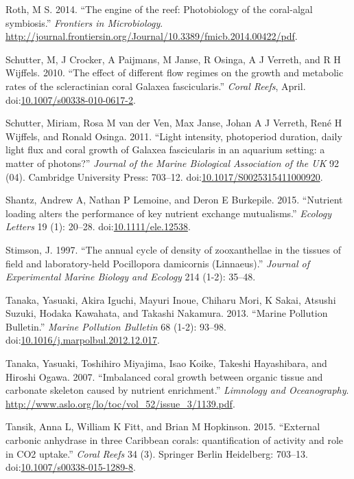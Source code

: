 \documentclass[]{elsarticle} %
\begin{document}
\hypertarget{ref-Roth:2014wf}{}
Roth, M S. 2014. ``The engine of the reef: Photobiology of the
coral-algal symbiosis.'' \emph{Frontiers in Microbiology}.
\url{http://journal.frontiersin.org/Journal/10.3389/fmicb.2014.00422/pdf}.

\hypertarget{ref-Schutter:2010p7758}{}
Schutter, M, J Crocker, A Paijmans, M Janse, R Osinga, A J Verreth, and
R H Wijffels. 2010. ``The effect of different flow regimes on the growth
and metabolic rates of the scleractinian coral Galaxea fascicularis.''
\emph{Coral Reefs}, April.
doi:\href{https://doi.org/10.1007/s00338-010-0617-2}{10.1007/s00338-010-0617-2}.

\hypertarget{ref-Schutter:2011ie}{}
Schutter, Miriam, Rosa M van der Ven, Max Janse, Johan A J Verreth, René
H Wijffels, and Ronald Osinga. 2011. ``Light intensity, photoperiod
duration, daily light flux and coral growth of Galaxea fascicularis in
an aquarium setting: a matter of photons?'' \emph{Journal of the Marine
Biological Association of the UK} 92 (04). Cambridge University Press:
703--12.
doi:\href{https://doi.org/10.1017/S0025315411000920}{10.1017/S0025315411000920}.

\hypertarget{ref-Shantz:2015dz}{}
Shantz, Andrew A, Nathan P Lemoine, and Deron E Burkepile. 2015.
``Nutrient loading alters the performance of key nutrient exchange
mutualisms.'' \emph{Ecology Letters} 19 (1): 20--28.
doi:\href{https://doi.org/10.1111/ele.12538}{10.1111/ele.12538}.

\hypertarget{ref-Stimson:1997p3837}{}
Stimson, J. 1997. ``The annual cycle of density of zooxanthellae in the
tissues of field and laboratory-held Pocillopora damicornis
(Linnaeus).'' \emph{Journal of Experimental Marine Biology and Ecology}
214 (1-2): 35--48.

\hypertarget{ref-Tanaka:2013dj}{}
Tanaka, Yasuaki, Akira Iguchi, Mayuri Inoue, Chiharu Mori, K Sakai,
Atsushi Suzuki, Hodaka Kawahata, and Takashi Nakamura. 2013. ``Marine
Pollution Bulletin.'' \emph{Marine Pollution Bulletin} 68 (1-2): 93--98.
doi:\href{https://doi.org/10.1016/j.marpolbul.2012.12.017}{10.1016/j.marpolbul.2012.12.017}.

\hypertarget{ref-Tanaka:2007uv}{}
Tanaka, Yasuaki, Toshihiro Miyajima, Isao Koike, Takeshi Hayashibara,
and Hiroshi Ogawa. 2007. ``Imbalanced coral growth between organic
tissue and carbonate skeleton caused by nutrient enrichment.''
\emph{Limnology and Oceanography}.
\url{http://www.aslo.org/lo/toc/vol_52/issue_3/1139.pdf}.

\hypertarget{ref-Tansik:2015cm}{}
Tansik, Anna L, William K Fitt, and Brian M Hopkinson. 2015. ``External
carbonic anhydrase in three Caribbean corals: quantification of activity
and role in CO2 uptake.'' \emph{Coral Reefs} 34 (3). Springer Berlin
Heidelberg: 703--13.
doi:\href{https://doi.org/10.1007/s00338-015-1289-8}{10.1007/s00338-015-1289-8}.
\end{document}
